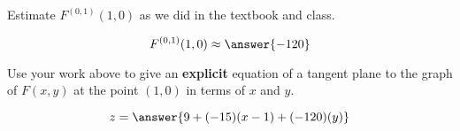 \documentclass{ximera}
\begin{document}
\begin{problem}
Estimate $F^{(0,1)}(1,0)$ as we did in the textbook and class.
\begin{prompt}
\[
  F^{(0,1)}(1,0) \approx \answer{-120}
\]
\end{prompt}

\vfill

\end{problem}


\begin{problem}
  Use your work above to give an \textbf{explicit} equation of a
  tangent plane to the graph of $F(x,y)$ at the point $(1,0)$ in terms
  of $x$ and $y$.
\begin{prompt}
\[
z = \answer{9 + (-15)(x - 1) + (-120)(y)}
\]
\end{prompt}

\vfill

\end{problem}



  
\end{document}
